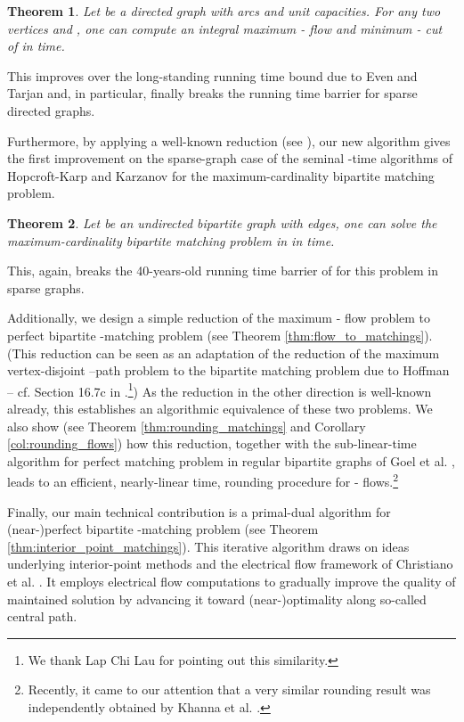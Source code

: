 \documentclass[11pt, letterpaper]{article}
\newtheorem{theorem}{Theorem}[section]
\begin{document}
\begin{theorem}\label{thm:main}
Let  be a directed graph with  arcs and unit capacities. For any two vertices  and , one can compute an integral maximum - flow and minimum - cut of  in  time.
\end{theorem}

This improves over the long-standing  running time bound due to Even and Tarjan \cite{EvenT75} and, in particular, finally breaks the  running time barrier for sparse directed graphs.  


Furthermore, by applying a well-known reduction (see \cite{CormenLRS09}), our new algorithm gives the first improvement on the sparse-graph case of the seminal -time algorithms of Hopcroft-Karp \cite{HopcroftK73} and Karzanov \cite{Karzanov73} for the maximum-cardinality bipartite matching problem. 

\begin{theorem}\label{thm:main_matchings}
Let  be an undirected bipartite graph with  edges, one can solve the maximum-cardinality bipartite matching problem in  in  time. 
\end{theorem}

\noindent This, again, breaks the 40-years-old running time barrier of  for this problem in sparse graphs. 

Additionally, we design a simple reduction of the maximum - flow problem to perfect bipartite -matching problem (see Theorem \ref{thm:flow_to_matchings}). (This reduction can be seen as an adaptation of the reduction of the maximum vertex-disjoint --path problem to the bipartite matching problem due to Hoffman \cite{Hoffman60} -- cf. Section 16.7c in \cite{Schrijver03}.\footnote{We thank Lap Chi Lau \cite{Lau13} for pointing out this similarity.}) As the reduction in the other direction is well-known already, this establishes an algorithmic equivalence of these two problems. We also show (see Theorem \ref{thm:rounding_matchings} and Corollary \ref{col:rounding_flows}) how this reduction, together with the sub-linear-time algorithm for perfect matching problem in regular bipartite graphs of Goel et al. \cite{GoelKK10}, leads to an efficient, nearly-linear time, rounding procedure for - flows.\footnote{Recently, it came to our attention that a very similar rounding result was independently obtained by Khanna et al. \cite{KhannaKL13}.}

Finally, our main technical contribution is a primal-dual algorithm for {(near-)}perfect bipartite -matching problem (see Theorem \ref{thm:interior_point_matchings}). This iterative algorithm draws on ideas underlying interior-point methods and the electrical flow framework of Christiano et al. \cite{ChristianoKMST11}. It employs electrical flow computations to gradually improve the quality of maintained solution by advancing it toward (near-)optimality along so-called central path. 
\end{document}
